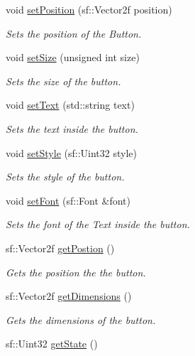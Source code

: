 \begin{DoxyCompactItemize}
void \hyperlink{class_create_button_a4ac68361b9c687e37171ad075b75968a}{set\+Position} (sf\+::\+Vector2f position)
\begin{DoxyCompactList}\small\item\em Sets the position of the Button. \end{DoxyCompactList}\item 
void \hyperlink{class_create_button_ae9cb9d8d704dd6c4fd307d5e9d1fe8cb}{set\+Size} (unsigned int size)
\begin{DoxyCompactList}\small\item\em Sets the size of the button. \end{DoxyCompactList}\item 
void \hyperlink{class_create_button_a378916a4a556d2785da7ec655b8bdc96}{set\+Text} (std\+::string text)
\begin{DoxyCompactList}\small\item\em Sets the text inside the button. \end{DoxyCompactList}\item 
void \hyperlink{class_create_button_aa3aac4b884181efb72c06a7dfff97137}{set\+Style} (sf\+::\+Uint32 style)
\begin{DoxyCompactList}\small\item\em Sets the style of the button. \end{DoxyCompactList}\item 
void \hyperlink{class_create_button_a48f90af032bd58935896f6c18ddcfe04}{set\+Font} (sf\+::\+Font \&font)
\begin{DoxyCompactList}\small\item\em Sets the font of the Text inside the button. \end{DoxyCompactList}\item 
sf\+::\+Vector2f \hyperlink{class_create_button_acb43c6f40f10ca61f3a4a3c0aeb32de9}{get\+Postion} ()
\begin{DoxyCompactList}\small\item\em Gets the position the the button. \end{DoxyCompactList}\item 
sf\+::\+Vector2f \hyperlink{class_create_button_a5edcddaeeeffb9c527ff6179c59bb168}{get\+Dimensions} ()
\begin{DoxyCompactList}\small\item\em Gets the dimensions of the button. \end{DoxyCompactList}\item 
sf\+::\+Uint32 \hyperlink{class_create_button_a1ba0464fcf148e99b0fcd9fcb9a7b90d}{get\+State} ()

\end{DoxyCompactItemize}
